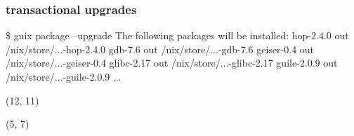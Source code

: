 \documentclass{beamer}
\begin{document}
\begin{frame}[fragile]
  \frametitle{transactional upgrades}

  \begin{semiverbatim}
\$ \alert<1>{guix package --upgrade}
The following packages will be installed:
   hop-2.4.0	out	/nix/store/...-hop-2.4.0
   gdb-7.6	out	/nix/store/...-gdb-7.6
   geiser-0.4	out	/nix/store/...-geiser-0.4
   glibc-2.17	out	/nix/store/...-glibc-2.17
   guile-2.0.9	out	/nix/store/...-guile-2.0.9
...

  \end{semiverbatim}

  \begin{textblock}{9}(12, 11)
  \end{textblock}

  \begin{textblock}{9}(5, 7)
  \end{textblock}

\end{frame}
\end{document}
